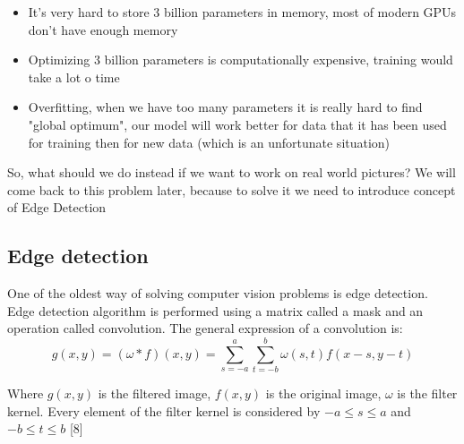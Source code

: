 \documentclass[letterpaper, 10 pt, conference]{ieeeconf}  %
\begin{document}
\begin{itemize}

\item It's very hard to store 3 billion parameters in memory, most of modern GPUs don't have enough memory

\item Optimizing 3 billion parameters is computationally expensive, training would take a lot o time

\item Overfitting, when we have too many parameters it is really hard to find "global optimum", our model will work better for data that it has been used for training then for new data (which is an unfortunate situation) 

\end{itemize}

So, what should we do instead if we want to work on real world pictures? We will come back to this problem later, because to solve it  we need to introduce concept of Edge Detection

\subsection{Edge detection}

One of the oldest way of solving computer vision problems is edge detection. Edge detection algorithm is performed using a matrix called a mask and an operation called convolution. The general expression of a convolution is:
\begin{equation}
    g(x, y)=(\omega * f)(x, y)=\sum_{s=-a}^{a} \sum_{t=-b}^{b} \omega(s, t) f(x-s, y-t)
\end{equation}

Where $g(x,y)$ is the filtered image, $f(x,y)$ is the original image, $\omega$ is the filter kernel. Every element of the filter kernel is considered by $-a \leqslant s \leqslant a$ and $-b \leqslant t \leqslant b$ [8]
\end{document}
